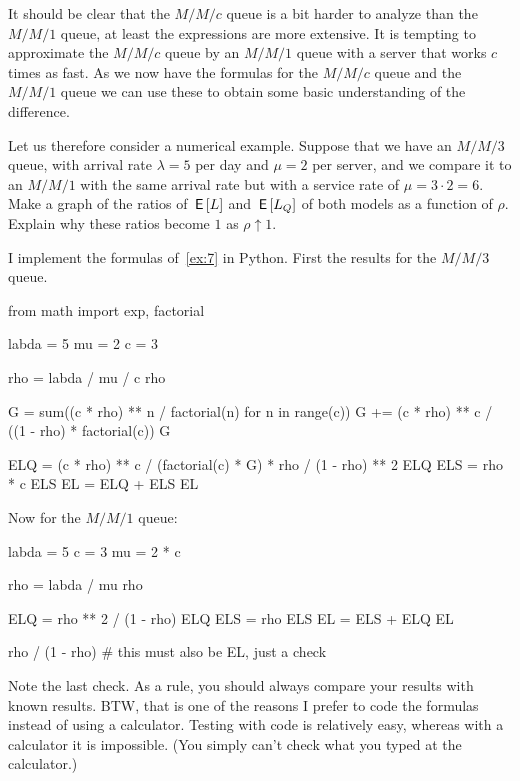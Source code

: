 \documentclass[companion]{subfiles}
\begin{document}
\begin{exercise}
 It should be clear that the $M/M/c$ queue is a bit harder to analyze than the $M/M/1$ queue, at least the expressions are more extensive.
 It is tempting to approximate the $M/M/c$ queue by an $M/M/1$ queue with a server that works $c$ times as fast.
 As we now have the formulas for the $M/M/c$ queue and the $M/M/1$ queue we can use these to obtain some basic understanding of the difference.
 
 Let us therefore consider a numerical example.
 Suppose that we have an $M/M/3$ queue, with arrival rate $\lambda = 5$ per day and $\mu=2$ per server, and we compare it to an $M/M/1$ with the same arrival rate but with a service rate of $\mu = 3\cdot 2 = 6$.
 Make a graph of the ratios of $\,\mathsf{E}\left[L\right]$ and $\,\mathsf{E}\left[L_Q\right]$ of both models as a function of $\rho$.
 Explain why these ratios become $1$ as $\rho\uparrow 1$. 
\begin{solution}
I implement the formulas of~\cref{ex:7} in Python. First the results for the $M/M/3$ queue.

\begin{pyconsole}
from math import exp, factorial

labda = 5
mu = 2
c = 3

rho = labda / mu / c
rho

G = sum((c * rho) ** n / factorial(n) for n in range(c))
G += (c * rho) ** c / ((1 - rho) * factorial(c))
G

ELQ = (c * rho) ** c / (factorial(c) * G) * rho / (1 - rho) ** 2
ELQ
ELS = rho * c
ELS
EL = ELQ + ELS
EL
\end{pyconsole}

Now for the $M/M/1$ queue:

\begin{pyconsole}
labda = 5
c = 3
mu = 2 * c

rho = labda / mu
rho

ELQ = rho ** 2 / (1 - rho)
ELQ
ELS = rho
ELS
EL = ELS + ELQ
EL

rho / (1 - rho)  # this must also be EL, just a check
\end{pyconsole}

Note the last check. As a rule, you should always compare your results
with known results. BTW, that is one of the reasons I prefer to code
the formulas instead of using a calculator. Testing with code is
relatively easy, whereas with a calculator it is impossible. (You
simply can't check what you typed at the calculator.)


\end{solution}
\end{exercise}
\end{document}
